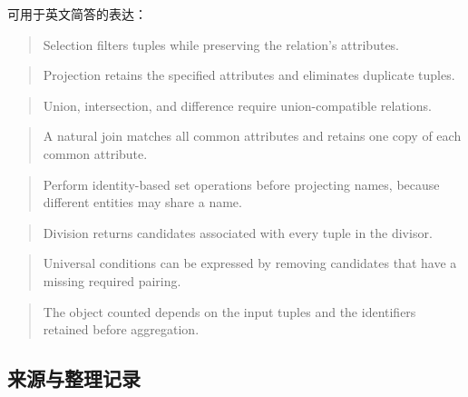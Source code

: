 可用于英文简答的表达：

\begin{quote}
Selection filters tuples while preserving the relation's attributes.
\end{quote}

\begin{quote}
Projection retains the specified attributes and eliminates duplicate tuples.
\end{quote}

\begin{quote}
Union, intersection, and difference require union-compatible relations.
\end{quote}

\begin{quote}
A natural join matches all common attributes and retains one copy of each common attribute.
\end{quote}

\begin{quote}
Perform identity-based set operations before projecting names, because different entities may share a name.
\end{quote}

\begin{quote}
Division returns candidates associated with every tuple in the divisor.
\end{quote}

\begin{quote}
Universal conditions can be expressed by removing candidates that have a missing required pairing.
\end{quote}

\begin{quote}
The object counted depends on the input tuples and the identifiers retained before aggregation.
\end{quote}

\subsection{来源与整理记录}\label{05_relational_algebra_zh-ux6765ux6e90ux4e0eux6574ux7406ux8bb0ux5f55}

